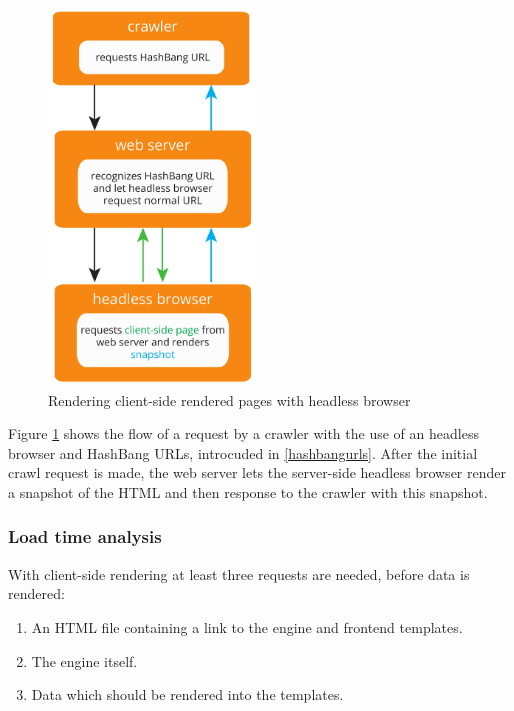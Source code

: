 \begin{figure}[H]
\centering
\includegraphics[height=10cm]{images/frontend_snapshots.pdf}
\caption[frontend_snapshots]{Rendering client-side rendered pages with headless browser}
\label{fig:frontend_snapshots}
\end{figure}

\noindent{}Figure \ref{fig:frontend_snapshots} shows the flow of a request by a crawler with the use of an headless browser and HashBang URLs, introcuded in \ref{hashbangurls}.
After the initial crawl request is made, the web server lets the server-side headless browser render a snapshot of the HTML and then response to the crawler with this snapshot.

\subsubsection{Load time analysis}
With client-side rendering at least three requests are needed, before data is rendered:
\begin{enumerate}
    \item An HTML file containing a link to the \ajax{} engine and frontend templates.
    \item The \ajax{} engine itself.
    \item Data which should be rendered into the templates.
\end{enumerate}

